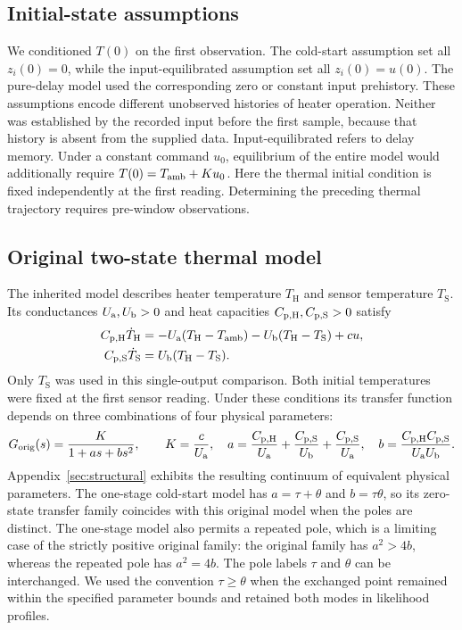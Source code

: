 \subsection{Initial-state assumptions}
We conditioned $T(0)$ on the first observation. The cold-start assumption set
all $z_i(0)=0$, while the input-equilibrated assumption set all $z_i(0)=u(0)$.
The pure-delay model used the corresponding zero or constant input prehistory.
These assumptions encode different unobserved histories of heater operation.
Neither was established by the recorded input before the first sample, because
that history is absent from the supplied data.
Input-equilibrated refers to delay memory. Under a constant command $u_0$,
equilibrium of the entire model would additionally require
$T(0)=T_{\mathrm{amb}}+Ku_0$. Here the thermal initial condition is fixed independently
at the first reading. Determining the preceding thermal trajectory requires
pre-window observations.

\subsection{Original two-state thermal model}
The inherited model describes heater temperature $T_{\mathrm H}$ and sensor
temperature $T_{\mathrm S}$. Its conductances $U_{\mathrm a},U_{\mathrm b}>0$ and heat capacities
$C_{\mathrm{p,H}},C_{\mathrm{p,S}}>0$ satisfy
\begin{align}
 C_{\mathrm{p,H}}\dot T_{\mathrm H}&=-U_{\mathrm a}(T_{\mathrm H}-T_{\mathrm{amb}})
                       -U_{\mathrm b}(T_{\mathrm H}-T_{\mathrm S})+cu,\\
 C_{\mathrm{p,S}}\dot T_{\mathrm S}&=U_{\mathrm b}(T_{\mathrm H}-T_{\mathrm S}).
 \label{eq:original}
\end{align}
Only $T_{\mathrm S}$ was used in this single-output comparison. Both initial
temperatures were fixed at the first sensor reading. Under these conditions its
transfer function depends on three combinations of four physical parameters:
\begin{equation}
 G_{\mathrm{orig}}(s)=\frac{K}{1+a s+b s^2},\qquad
 K=\frac{c}{U_{\mathrm a}},\quad
 a=\frac{C_{\mathrm{p,H}}}{U_{\mathrm a}}+\frac{C_{\mathrm{p,S}}}{U_{\mathrm b}}+\frac{C_{\mathrm{p,S}}}{U_{\mathrm a}},\quad
 b=\frac{C_{\mathrm{p,H}}C_{\mathrm{p,S}}}{U_{\mathrm a}U_{\mathrm b}}.
 \label{eq:original-transfer}
\end{equation}
Appendix~\ref{sec:structural} exhibits the resulting continuum of equivalent
physical parameters. The one-stage cold-start model has $a=\tau+\theta$ and
$b=\tau\theta$, so its zero-state transfer family coincides with this original
model when the poles are distinct. The one-stage model also permits a repeated
pole, which is a limiting case of the strictly positive original family:
the original family has $a^2>4b$, whereas the repeated pole has $a^2=4b$.
The pole labels $\tau$ and $\theta$ can be interchanged. We used the
convention $\tau\geq\theta$ when the exchanged point remained within the
specified parameter bounds and retained both modes in likelihood profiles.
